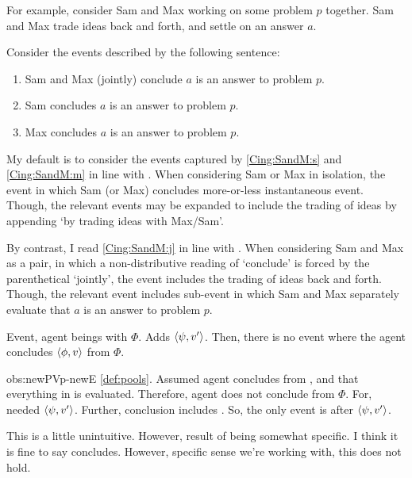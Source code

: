 \begin{note}
{  For example, consider Sam and Max working on some problem \(p\) together.
  Sam and Max trade ideas back and forth, and settle on an answer \(a\).

  Consider the events described by the following sentence:
  \begin{enumerate}[label=\arabic*., ref=(\arabic*), noitemsep]
  \item
    \label{Cing:SandM:j}
    Sam and Max (jointly) conclude \(a\) is an answer to problem \(p\).
  \item
    \label{Cing:SandM:s}
    Sam concludes \(a\) is an answer to problem \(p\).
  \item
    \label{Cing:SandM:m}
    Max concludes \(a\) is an answer to problem \(p\).
  \end{enumerate}

  My default is to consider the events captured by \ref{Cing:SandM:s} and \ref{Cing:SandM:m} in line with \citeauthor{Gardner:1986wp}.
  When considering Sam or Max in isolation, the event in which Sam (or Max) concludes more-or-less instantaneous event.
  Though, the relevant events may be expanded to include the trading of ideas by appending `by trading ideas with Max/Sam'.

  By contrast, I read \ref{Cing:SandM:j} in line with \citeauthor{Bratman:1979aa}.
  When considering Sam and Max as a pair, in which a non-distributive reading of `conclude' is forced by the parenthetical `jointly', the event includes the trading of ideas back and forth.
  Though, the relevant event includes sub-event in which Sam and Max separately evaluate that \(a\) is an answer to problem \(p\).
  }
\end{note}

\begin{note}
  \begin{observation}
    \label{obs:newPVp-newE}
    Event, agent beings with \pool{} \(\Phi\).
    Adds \(\langle \psi, v' \rangle\).
    Then, there is no event where the agent concludes \(\langle \phi, v \rangle\) from \(\Phi\).
  \end{observation}

  \begin{motivation}{obs:newPVp-newE}
    \autoref{def:pools}.
    Assumed agent concludes from \pool{}, and that everything in \pool{} is evaluated.
    Therefore, agent does not conclude from \(\Phi\).
    For, needed \(\langle \psi, v' \rangle\).
    Further, conclusion includes \pool{}.
    So, the only event is after \(\langle \psi, v' \rangle\).
  \end{motivation}

  This is a little unintuitive.
  However, result of being somewhat specific.
  I think it is fine to say concludes.
  However, specific sense we're working with, this does not hold.
\end{note}

